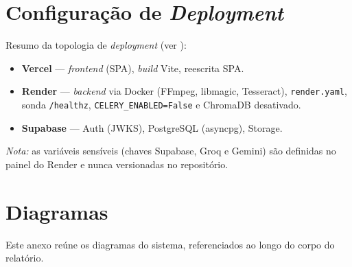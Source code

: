 \chapter{Configuração de \emph{Deployment}}
\label{ap:deploy}

Resumo da topologia de \emph{deployment} (ver ):

\begin{itemize}[leftmargin=*]
  \item \textbf{Vercel} — \emph{frontend} (SPA), \emph{build} Vite,
  reescrita SPA.
  \item \textbf{Render} — \emph{backend} via Docker (FFmpeg, libmagic,
  Tesseract), \texttt{render.yaml}, sonda \texttt{/healthz},
  \texttt{CELERY\_ENABLED=False} e ChromaDB desativado.
  \item \textbf{Supabase} — Auth (JWKS), PostgreSQL (asyncpg), Storage.
\end{itemize}

\noindent\emph{Nota:} as variáveis sensíveis (chaves Supabase, Groq e
Gemini) são definidas no painel do Render e nunca versionadas no
repositório.

\chapter{Diagramas}
\label{ap:diagramas}

Este anexo reúne os diagramas do sistema, referenciados ao longo do corpo do
relatório.

